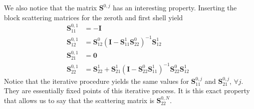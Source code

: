 We also notice that the matrix $\mathbf{S}^{0,j}$ has an interesting property.
Inserting the block scattering matrices for the zeroth and first shell yield
    \begin{subequations}
    \begin{align}
      \mathbf{S}^{0,1}_{11}	&= -\mathbf{I}	\\
      \mathbf{S}^{0,1}_{12}	&= \mathbf{S}^0_{12}\left(\mathbf{I}-\mathbf{S}^1_{11}\mathbf{S}^0_{22}\right)^{-1}\mathbf{S}^1_{12}	\\
      \mathbf{S}^{0,1}_{21}	&= \mathbf{0}	\\
      \mathbf{S}^{0,1}_{22}	&= \mathbf{S}^1_{22}+\mathbf{S}^1_{21}\left(\mathbf{I}-\mathbf{S}^0_{22}\mathbf{S}^1_{11}\right)^{-1}\mathbf{S}^0_{22}\mathbf{S}^1_{12}
    \end{align}
    \end{subequations}
Notice that the iterative procedure yields the same values for $\mathbf{S}^{0,j}_{11}$ and $\mathbf{S}^{0,j}_{21}$, $\forall j$. 
They are essentially fixed points of this iterative process.
It is this exact property that allows us to say that the scattering matrix is $\mathbf{S}^{0,N}_{22}$. 
	
